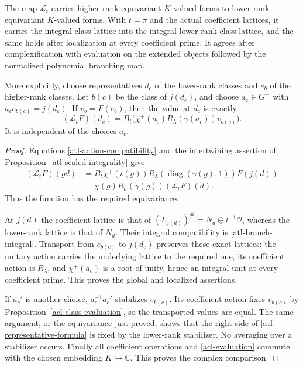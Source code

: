 \begin{theorem}\label{atl-global-lowering}
The map $\mathcal L_t$ carries higher-rank equivariant
$K$-valued forms to lower-rank equivariant $K$-valued
forms.  With $t=\bar\pi$ and the actual coefficient
lattices, it carries the integral class lattice into
the integral lower-rank class lattice, and the same
holds after localization at every coefficient prime.
It agrees after complexification with evaluation on
the extended objects followed by the normalized
polynomial branching map.

More explicitly, choose representatives $d_c$ of the
lower-rank classes and $e_b$ of the higher-rank classes.
Let $b(c)$ be the class of $j(d_c)$, and choose
$a_c\in G^+$ with $a_ce_{b(c)}=j(d_c)$.  If $v_b=F(e_b)$,
then the value at $d_c$ is exactly
\begin{equation}\label{atl-representative-formula}
             (\mathcal L_tF)(d_c)
                 =B_t\bigl(\chi^+(a_c)
                          R_\lambda(\gamma(a_c))v_{b(c)}\bigr).
\end{equation}
It is independent of the choices $a_c$.
\end{theorem}
\begin{proof}
Equations \eqref{atl-action-compatibility} and the
intertwining assertion of
Proposition~\ref{atl-scaled-integrality} give
\begin{align*}
 (\mathcal L_tF)(gd)
  &=B_t\chi^+(\iota(g))
               R_\lambda(\operatorname{diag}(\gamma(g),1))F(j(d))\\
  &=\chi(g)R_\sigma(\gamma(g))(\mathcal L_tF)(d).
\end{align*}
Thus the function has the required equivariance.

At $j(d)$ the coefficient lattice is that of
$(L_{j(d)})^\#=N_d\oplus t^{-1}\mathcal O$,
whereas the lower-rank lattice is that of $N_d$.
Their integral compatibility is
\eqref{atl-branch-integral}.  Transport from $e_{b(c)}$
to $j(d_c)$ preserves these exact lattices: the
unitary action carries the underlying lattice to
the required one, its coefficient action is $R_\lambda$,
and $\chi^+(a_c)$ is a root of unity, hence an integral
unit at every coefficient prime.  This proves the
global and localized assertions.

If $a_c'$ is another choice, $a_c^{-1}a_c'$ stabilizes
$e_{b(c)}$.  Its coefficient action fixes $v_{b(c)}$
by Proposition~\ref{acl-class-evaluation}, so the
transported values are equal.  The same argument,
or the equivariance just proved, shows that the
right side of \eqref{atl-representative-formula}
is fixed by the lower-rank stabilizer.  No averaging
over a stabilizer occurs.  Finally all coefficient
operations and \eqref{acl-evaluation} commute with
the chosen embedding $K\hookrightarrow\mathbb C$.
This proves the complex comparison.
\end{proof}

